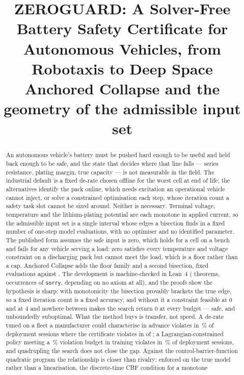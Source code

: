 \documentclass[11pt,letterpaper]{article}
\title{\vspace{-1.4cm}\large\textbf{ZEROGUARD: A Solver-Free Battery Safety Certificate for\\[2pt]
Autonomous Vehicles, from Robotaxis to Deep Space}\\[5pt]
\normalsize\normalfont Anchored Collapse and the geometry of the admissible input set}
\author{}
\date{}
\theoremstyle{definition}
\theoremstyle{remark}
\begin{document}
\maketitle
\vspace{-1.4cm}

\begin{abstract}
An autonomous vehicle's battery must be pushed hard enough to be useful and held back enough to be
safe, and the state that decides where that line falls --- series resistance, plating margin, true
capacity --- is not measurable in the field. The industrial default is a fixed de-rate chosen offline
for the worst cell at end of life; the alternatives identify the pack online, which needs
excitation an operational vehicle cannot inject, or solve a constrained optimisation each step,
whose iteration count a safety task slot cannot be sized around. Neither is necessary. Terminal voltage, temperature and the lithium-plating potential are each
monotone in applied current, so the admissible input set is a single interval whose edges a bisection
finds in a fixed number of one-step model evaluations, with no optimiser and no identified parameter.
The published form assumes the safe input is zero, which holds for a cell on a bench and fails for any
vehicle serving a load: zero satisfies every temperature and voltage constraint on a discharging pack
but cannot meet the load, which is a floor rather than a cap. Anchored Collapse adds the floor family
and a second bisection, \evalDischarge{} fixed evaluations against \evalCharge. The development is
machine-checked in Lean~4 (\leanThms{} theorems, \leanSorry{} occurrences of \texttt{sorry},
\leanFreeWord{} depending on no axiom at all), and the proofs show the hypothesis is sharp: with
monotonicity the bisection provably brackets the true edge, so a fixed iteration count is a fixed
accuracy, and without it a constraint feasible at $0$ and at $4$ and nowhere between makes the search
return $0$ at every budget --- safe, and unboundedly suboptimal. What the method buys is transfer, not
speed. A de-rate tuned on a fleet a manufacturer could characterise in advance violates in
\bThreeTunedViolPct\,\% of deployment sessions where the certificate violates in \bThreeZgViol{} of
\bThreeTrials; a Lagrangian-constrained policy meeting a \rlHardTrain\,\% violation budget in training
violates in \rlHardDeploy\,\% of deployment sessions, and quadrupling the search does not close the
gap. Against the control-barrier-function quadratic program the relationship is closer than rivalry:
enforced on the true model rather than a linearisation, the discrete-time CBF condition for a monotone

\end{abstract}
\end{document}
